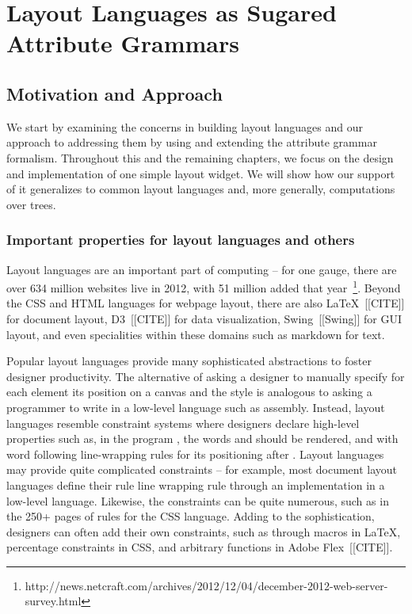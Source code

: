 \chapter{Layout Languages as Sugared Attribute Grammars}
\section{Motivation and Approach}

We start by examining the concerns in building layout languages and our approach to addressing them by using and extending the attribute grammar formalism.  Throughout this and the remaining chapters, we focus on the design and implementation of one simple layout widget. We will show how our support of it generalizes to common layout languages and, more generally, computations over trees.

\subsection{Important properties for layout languages and others}
Layout languages are an important part of computing -- for one gauge, there are over 634 million websites live in 2012, with 51 million added that year~\footnote{http://news.netcraft.com/archives/2012/12/04/december-2012-web-server-survey.html}. Beyond the CSS and HTML languages for webpage layout, there are also \LaTeX~[[CITE]] for document layout, D3~[[CITE]] for data visualization, Swing~[[Swing]] for GUI layout, and even specialities within these domains such as markdown for text. 


Popular layout languages provide many sophisticated abstractions to foster designer productivity.
The alternative of asking a designer to manually specify for each element its position on a canvas and the style is analogous to asking a programmer to write in a low-level language such as assembly. Instead, layout languages resemble constraint systems where designers  declare high-level properties such as, in the program , the words  and  should be rendered, and with word  following line-wrapping rules for its positioning after . Layout languages may provide quite complicated constraints -- for example, most document layout languages define their rule line wrapping rule through an implementation in  a low-level language. Likewise, the constraints can be quite numerous, such as in the 250+ pages of rules for the CSS language. Adding to the sophistication, designers can often add their own constraints, such as through macros in \LaTeX,  percentage constraints in CSS, and arbitrary functions in Adobe Flex~[[CITE]]. 

